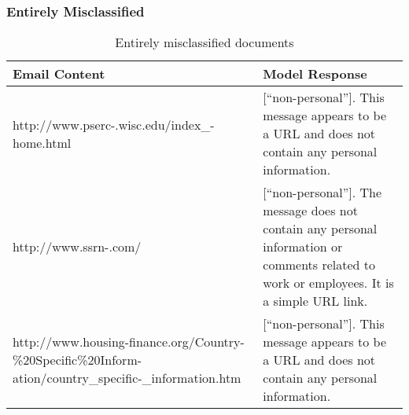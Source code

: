\subsubsection{Entirely Misclassified} 
\begin{table}[!htb]
\caption{Entirely misclassified documents}
\label{table:all_wrong}
\begin{tabular}{p{1.2in}p{1.8in}}
\hline
Email Content                                & Model Response                                                                                                           \\ \hline
http://www.pserc-.wisc.edu/index\_-home.html &
  {[}“non-personal”{]}. This message appears to be a URL and does not contain any personal information.            \\ \hline
http://www.ssrn-.com/                        & {[}“non-personal”{]}. The message does not contain any personal information or comments related to work or employees. It is a simple URL link. \\ \hline
http://www.housing-finance.org/Country-\%20Specific\%20Inform-ation/country\_specific-\_information.htm &
  {[}“non-personal”{]}. This message appears to be a URL and does not contain any personal information. \\ \hline
\end{tabular}
\end{table}

